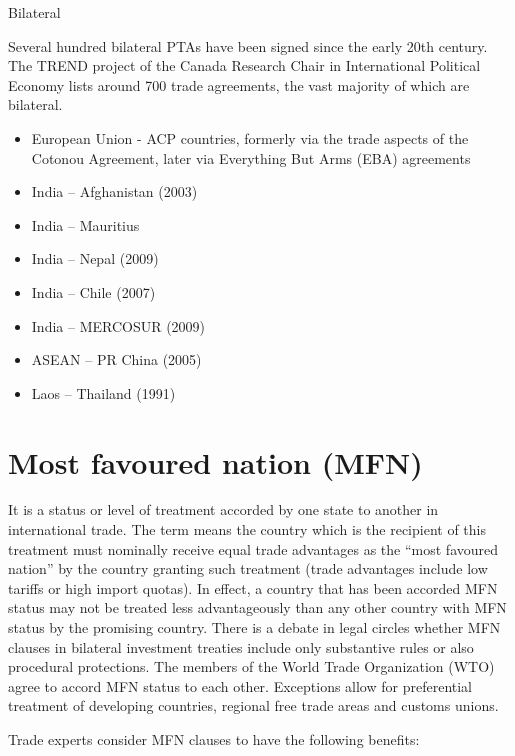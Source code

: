 \documentclass[
  openany]{book}
\providecommand{\tightlist}{%
  \setlength{\itemsep}{0pt}\setlength{\parskip}{0pt}}
\begin{document}
Bilateral

Several hundred bilateral PTAs have been signed since the early 20th century. The TREND project of the Canada Research Chair in International Political Economy lists around 700 trade agreements, the vast majority of which are bilateral.

\begin{itemize}
\tightlist
\item
  European Union - ACP countries, formerly via the trade aspects of the Cotonou Agreement, later via Everything But Arms (EBA) agreements
\item
  India -- Afghanistan (2003)
\item
  India -- Mauritius
\item
  India -- Nepal (2009)
\item
  India -- Chile (2007)
\item
  India -- MERCOSUR (2009)
\item
  ASEAN -- PR China (2005)
\item
  Laos -- Thailand (1991)
\end{itemize}

\hypertarget{most-favoured-nation-mfn}{%
\section{Most favoured nation (MFN)}\label{most-favoured-nation-mfn}}

It is a status or level of treatment accorded by one state to another in international trade. The term means the country which is the recipient of this treatment must nominally receive equal trade advantages as the ``most favoured nation'' by the country granting such treatment (trade advantages include low tariffs or high import quotas). In effect, a country that has been accorded MFN status may not be treated less advantageously than any other country with MFN status by the promising country. There is a debate in legal circles whether MFN clauses in bilateral investment treaties include only substantive rules or also procedural protections. The members of the World Trade Organization (WTO) agree to accord MFN status to each other. Exceptions allow for preferential treatment of developing countries, regional free trade areas and customs unions.

Trade experts consider MFN clauses to have the following benefits:
\end{document}
